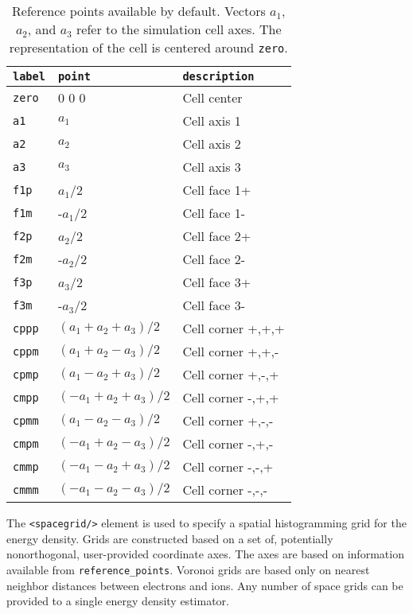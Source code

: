 \FloatBarrier
\begin{table}[h]
\begin{center}
\caption{Reference points available by default.  Vectors $a_1$, $a_2$, and $a_3$ refer to the simulation cell axes.  The representation of the cell is centered around \texttt{zero}.\label{tab:ref_points}}
\begin{tabular}{l l l}
\hline
\texttt{label} & \texttt{point} & \texttt{description} \\
\hline
\texttt{zero} & 0 0 0    & Cell center  \\
\texttt{a1}   &  $a_1$   & Cell axis 1  \\
\texttt{a2}   &  $a_2$   & Cell axis 2  \\
\texttt{a3}   &  $a_3$   & Cell axis 3  \\
\texttt{f1p}  &  $a_1$/2 & Cell face 1+ \\
\texttt{f1m}  & -$a_1$/2 & Cell face 1- \\
\texttt{f2p}  &  $a_2$/2 & Cell face 2+ \\
\texttt{f2m}  & -$a_2$/2 & Cell face 2- \\
\texttt{f3p}  &  $a_3$/2 & Cell face 3+ \\
\texttt{f3m}  & -$a_3$/2 & Cell face 3- \\
\texttt{cppp} & $(a_1+a_2+a_3)/2$  & Cell corner +,+,+ \\
\texttt{cppm} & $(a_1+a_2-a_3)/2$  & Cell corner +,+,- \\
\texttt{cpmp} & $(a_1-a_2+a_3)/2$  & Cell corner +,-,+ \\
\texttt{cmpp} & $(-a_1+a_2+a_3)/2$ & Cell corner -,+,+ \\
\texttt{cpmm} & $(a_1-a_2-a_3)/2$  & Cell corner +,-,- \\
\texttt{cmpm} & $(-a_1+a_2-a_3)/2$ & Cell corner -,+,- \\
\texttt{cmmp} & $(-a_1-a_2+a_3)/2$ & Cell corner -,-,+ \\
\texttt{cmmm} & $(-a_1-a_2-a_3)/2$ & Cell corner -,-,- \\
\hline
\end{tabular}
\end{center}
\end{table}
\FloatBarrier



The \texttt{<spacegrid/>} element is used to specify a spatial histogramming grid for the energy density.  Grids are constructed based on a set of, potentially nonorthogonal, user-provided coordinate axes.  The axes are based on information available from \texttt{reference\_points}.  Voronoi grids are based only on nearest neighbor distances between electrons and ions.  Any number of space grids can be provided to a single energy density estimator.


